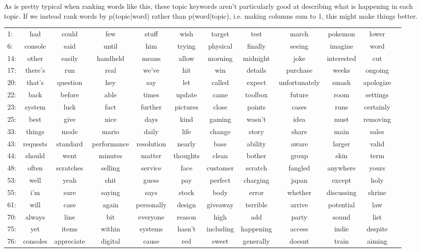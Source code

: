 \documentclass[11pt]{article} %
\begin{document}
\begin{landscape}


As is pretty typical when ranking words like this, these topic keywords aren't particularly good at describing what is happening in each topic. If we instead rank words by p(topic|word) rather than p(word|topic), i.e. making columns sum to 1, this might make things better.
\\

\begin{tabular}{|l|c c c c c c c c c c c}
1: &  had&could&few&stuff&wish&target&test&march&pokemon&lower\\
6: &  console&said&until&him&trying&physical&finally&seeing&imagine&word\\
14: &  other&easily&handheld&means&allow&morning&midnight&joke&interested&cut\\
17: &  there's&run&real&we've&hit&win&details&purchase&weeks&ongoing\\
20: &  that's&question&hey&say&let&called&expect&unfortunately&smash&apologize\\
22: &  back&before&able&times&update&came&toolbox&future&room&settings\\
23: &  system&luck&fact&further&pictures&close&points&cases&runs&certainly\\
25: &  best&give&nice&days&kind&gaming&wasn't&idea&must&removing\\
33: &  things&mode&mario&daily&life&change&story&share&main&sales\\
43: &  requests&standard&performance&resolution&nearly&base&ability&aware&larger&valid\\
44: &  should&went&minutes&matter&thoughts&clean&bother&group&skin&term\\
48: &  often&scratches&selling&service&face&customer&scratch&fangled&anywhere&yours\\
53: &  well&yeah&shit&guess&pay&perfect&charging&japan&except&holy\\
55: &  i'm&sure&saying&says&stock&body&error&whether&discussing&shrine\\
61: &  will&case&again&personally&design&giveaway&terrible&arrive&potential&law\\
70: &  always&line&bit&everyone&reason&high&add&party&sound&list\\
75: &  yet&items&within&systems&hasn't&including&happening&access&indie&despite\\
76: &  consoles&appreciate&digital&cause&red&sweet&generally&doesnt&train&aiming\\

\end{tabular}
\end{landscape}
\end{document}
